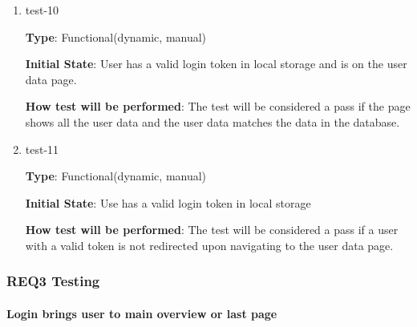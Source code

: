 \documentclass[12pt, titlepage]{article}
\begin{document}
\begin{enumerate}
\item{test-10\\}

\textbf{Type}: Functional(dynamic, manual)
					
\textbf{Initial State}: User has a valid login token in local storage and is on the user data page.
					
\textbf{How test will be performed}: The test will be considered a pass if the page shows all the user data and the user data matches the data in the database.
					
\item{test-11\\}

\textbf{Type}: Functional(dynamic, manual)
					
\textbf{Initial State}: Use has a valid login token in local storage

\textbf{How test will be performed}: The test will be considered a pass if a user with a valid token is not redirected upon navigating to the user data page.

\end{enumerate}

\subsubsection{REQ3 Testing}
		
\paragraph{Login brings user to main overview or last page}
\end{document}
